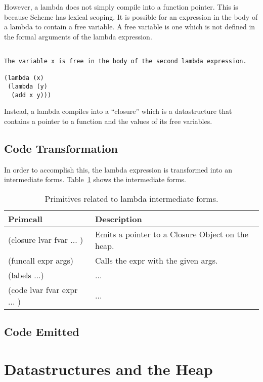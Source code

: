 \documentclass{article}
\begin{document}
However, a lambda does not simply compile into a function pointer. This is because Scheme has lexical scoping. It is possible for an expression in the body of a lambda to contain a free variable. A free variable is one which is not defined in the formal arguments of the lambda expression. 

\begin{verbatim}

The variable x is free in the body of the second lambda expression. 

(lambda (x) 
 (lambda (y) 
  (add x y)))

\end{verbatim}

Instead, a lambda compiles into a ``closure'' which is a datastructure that contains a pointer to a function and the values of its free variables.



\subsection{Code Transformation}

In order to accomplish this, the lambda expression is transformed into an intermediate forms. Table~\ref{tab:lambda_intermediate} shows the intermediate forms. 

\begin{table}[ht]
  \centering
\begin{tabular}{ l l }
  \toprule
  Primcall & Description \\ \hline
  \midrule
  (closure lvar fvar ... ) & Emits a pointer to a Closure Object on the heap.  \\
  (funcall expr args) & Calls the expr with the given args.  \\
  (labels ...) & ... \\
  (code lvar fvar expr ... ) & ... \\
  \bottomrule
\end{tabular}
\caption{Primitives related to lambda intermediate forms.} \label{tab:lambda_intermediate}
\end{table}

\subsection{Code Emitted}




\section{Datastructures and the Heap}
\end{document}
